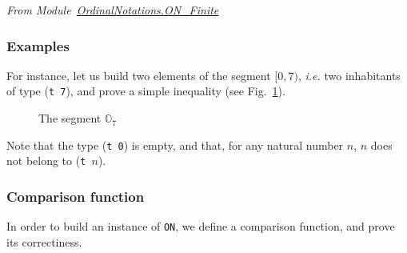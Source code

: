 \vspace{4pt}
\noindent\emph{From Module~\href{../theories/html/hydras.OrdinalNotations.ON_Finite.html}{OrdinalNotations.ON\_Finite}}

\label{def:Finite-ord-type}



\subsubsection{Examples}

For instance, let us build two elements of the segment $[0, 7)$, \emph{i.e.} two
inhabitants of   type (\texttt{t 7}), and prove a simple  inequality (see Fig.~\ref{fig:O7}).

\begin{figure}[h]
\centering
{}

\caption{The segment $\mathbb{O}_7$\label{fig:O7}}
\end{figure}
  






Note that the type (\texttt{t 0}) is empty, and that, for any natural number
 $n$, $n$ does not belong to (\texttt{t $n$}).


\subsubsection{Comparison function}

In order to build an instance of \texttt{ON}, we define a comparison function,  and prove its correctiness.

\vspace{4pt}

